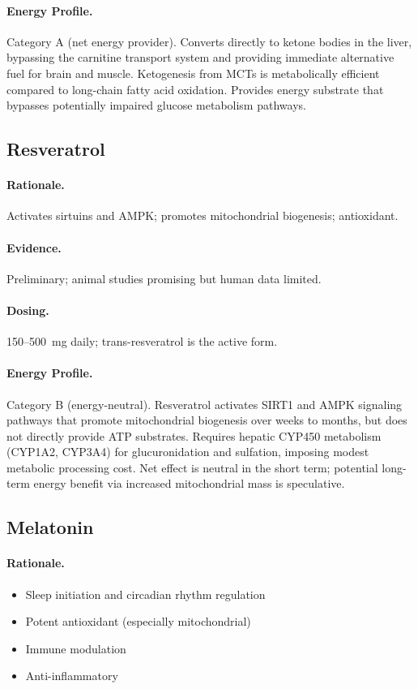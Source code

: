 \paragraph{Energy Profile.}
Category A (net energy provider). Converts directly to ketone bodies in the liver, bypassing the carnitine transport system and providing immediate alternative fuel for brain and muscle. Ketogenesis from MCTs is metabolically efficient compared to long-chain fatty acid oxidation. Provides energy substrate that bypasses potentially impaired glucose metabolism pathways.

\subsection{Resveratrol}

\paragraph{Rationale.} Activates sirtuins and AMPK; promotes mitochondrial biogenesis; antioxidant.

\paragraph{Evidence.} Preliminary; animal studies promising but human data limited.

\paragraph{Dosing.} 150--500~mg daily; trans-resveratrol is the active form.

\paragraph{Energy Profile.}
Category B (energy-neutral). Resveratrol activates SIRT1 and AMPK signaling pathways that promote mitochondrial biogenesis over weeks to months, but does not directly provide ATP substrates. Requires hepatic CYP450 metabolism (CYP1A2, CYP3A4) for glucuronidation and sulfation, imposing modest metabolic processing cost. Net effect is neutral in the short term; potential long-term energy benefit via increased mitochondrial mass is speculative.

\subsection{Melatonin}

\paragraph{Rationale.}
\begin{itemize}
    \item Sleep initiation and circadian rhythm regulation
    \item Potent antioxidant (especially mitochondrial)
    \item Immune modulation
    \item Anti-inflammatory
\end{itemize}

